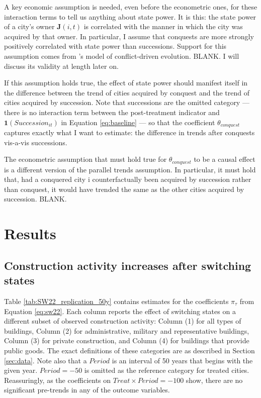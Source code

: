 \documentclass[11pt, a4paper]{article}
\begin{document}
A key economic assumption is needed, even before the econometric ones, for these interaction terms to tell us anything about state power. It is this: the state power of a city's owner $\mathbf{J}(i, t)$ is correlated with the manner in which the city was acquired by that owner. In particular, I assume that conquests are more strongly positively correlated with state power than successions. Support for this assumption comes from \cite{levine2021}'s model of conflict-driven evolution. BLANK. I will discuss its validity at length later on.

If this assumption holds true, the effect of state power should manifest itself in the difference between the trend of cities acquired by conquest and the trend of cities acquired by succession. Note that successions are the omitted category --- there is no interaction term between the post-treatment indicator and $\mathbf{1}(Succession_{it})$ in Equation \eqref{eq:baseline} --- so that the coefficient $\theta_{conquest}$ captures exactly what I want to estimate: the difference in trends after conquests vis-a-vis successions.

The econometric assumption that must hold true for $\theta_{conquest}$ to be a causal effect is a different version of the parallel trends assumption. In particular, it must hold that, had a conquered city i counterfactually been acquired by succession rather than conquest, it would have trended the same as the other cities acquired by succession. BLANK.



\section{Results} \label{sec:results}

\subsection{Construction activity increases after switching states}

Table \ref{tab:SW22_replication_50y} contains estimates for the coefficients $\pi_\tau$ from Equation \eqref{eq:sw22}. Each column reports the effect of switching states on a different subset of observed construction activity: Column (1) for all types of buildings, Column (2) for administrative, military and representative buildings, Column (3) for private construction, and Column (4) for buildings that provide public goods. The exact definitions of these categories are as described in Section \ref{sec:data}. Note also that a $Period$ is an interval of 50 years that begins with the given year. $Period = -50$ is omitted as the reference category for treated cities. Reassuringly, as the coefficients on $Treat \times Period = -100$ show, there are no significant pre-trends in any of the outcome variables. 
\end{document}
